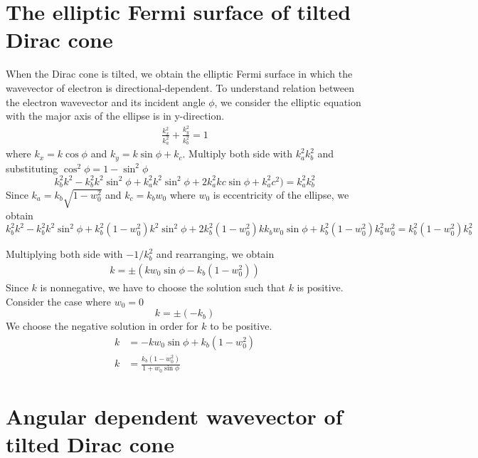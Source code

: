 \section{The elliptic Fermi surface of tilted Dirac cone} \label{sec:elliptic fermi surface}
    When the Dirac cone is tilted, we obtain the elliptic Fermi surface in which the wavevector of electron is directional-dependent.
    To understand relation between the electron wavevector and its incident angle $\phi$, we consider the elliptic equation with the major axis of the ellipse is in y-direction.
    \begin{align} \label{eq:elliptic eq}
        \frac{k_x^2}{k_a^2} + \frac{k_y^2}{k_b^2} = 1
    \end{align}
    where $k_x = k\cos{\phi}$ and $k_y = k\sin{\phi} + k_c$. Multiply both side with $k_a^2 k_b^2$ and substituting $\cos^2{\phi} = 1 - \sin^2{\phi}$
    $$
    k_b^2 k^2 -k_b^2 k^2 \sin^2{\phi} + k_a^2k^2 \sin^2{\phi}+2 k_a^2 k c \sin{\phi} +k_a^2 c^2)=k_a^2 k_b^2
    $$
    Since $k_a = k_b \sqrt{1-w_0^2}$ and $k_c = k_b w_0$ where $w_0$ is eccentricity of the ellipse, we obtain
    $$
    k_b^2 k^2 - k_b^2 k^2 \sin^2{\phi} + k_b^2 (1-w_0^2)k^2 \sin^2{\phi}+2 k_b^2 (1-w_0^2) k k_b w_0 \sin{\phi} +k_b^2 (1-w_0^2) k_b^2 w_0^2=k_b^2 (1-w_0^2) k_b^2
    $$

    Multiplying both side with $-1/k_b^2$ and rearranging, we obtain
    \begin{align} 
        k = \pm (k w_0 \sin{\phi} - k_b(1-w_0^2))
    \end{align}
    Since $k$ is nonnegative, we have to choose the solution such that $k$ is positive.
    Consider the case where $w_0 = 0$
    $$
    k = \pm (-k_b)
    $$
    We choose the negative solution in order for $k$ to be positive.
    \begin{equation}
    \begin{aligned} \label{eq:k vs phi}
        k &= -k w_0 \sin{\phi}+ k_b (1-w_0^2)\\
        k &= \frac{k_b(1-w_0^2)}{1+w_0 \sin{\phi}}
    \end{aligned}
    \end{equation}

\section{Angular dependent wavevector of tilted Dirac cone} \label{sec:k angular dependent k}
     
